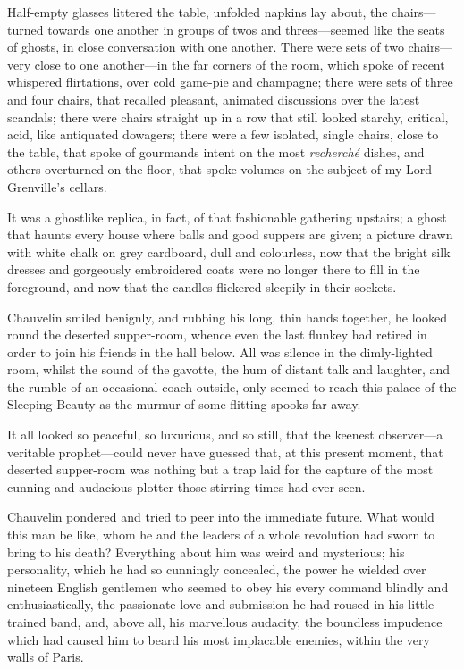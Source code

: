Half-empty glasses littered the table, unfolded napkins lay about, the chairs\allowbreak---\allowbreak turned towards one another in groups of twos and threes\allowbreak---\allowbreak seemed like the seats of ghosts, in close conversation with one another. There were sets of two chairs\allowbreak---\allowbreak very close to one another\allowbreak---\allowbreak in the far corners of the room, which spoke of recent whispered flirtations, over cold game-pie and champagne; there were sets of three and four chairs, that recalled pleasant, animated discussions over the latest scandals; there were chairs straight up in a row that still looked starchy, critical, acid, like antiquated dowagers; there were a few isolated, single chairs, close to the table, that spoke of gourmands intent on the most \textit{recherché} dishes, and others overturned on the floor, that spoke volumes on the subject of my Lord Grenville's cellars.

It was a ghostlike replica, in fact, of that fashionable gathering upstairs; a ghost that haunts every house where balls and good suppers are given; a picture drawn with white chalk on grey cardboard, dull and colourless, now that the bright silk dresses and gorgeously embroidered coats were no longer there to fill in the foreground, and now that the candles flickered sleepily in their sockets.

Chauvelin smiled benignly, and rubbing his long, thin hands together, he looked round the deserted supper-room, whence even the last flunkey had retired in order to join his friends in the hall below. All was silence in the dimly-lighted room, whilst the sound of the gavotte, the hum of distant talk and laughter, and the rumble of an occasional coach outside, only seemed to reach this palace of the Sleeping Beauty as the murmur of some flitting spooks far away.

It all looked so peaceful, so luxurious, and so still, that the keenest observer\allowbreak---\allowbreak a veritable prophet\allowbreak---\allowbreak could never have guessed that, at this present moment, that deserted supper-room was nothing but a trap laid for the capture of the most cunning and audacious plotter those stirring times had ever seen.

Chauvelin pondered and tried to peer into the immediate future. What would this man be like, whom he and the leaders of a whole revolution had sworn to bring to his death? Everything about him was weird and mysterious; his personality, which he had so cunningly concealed, the power he wielded over nineteen English gentlemen who seemed to obey his every command blindly and enthusiastically, the passionate love and submission he had roused in his little trained band, and, above all, his marvellous audacity, the boundless impudence which had caused him to beard his most implacable enemies, within the very walls of Paris.

